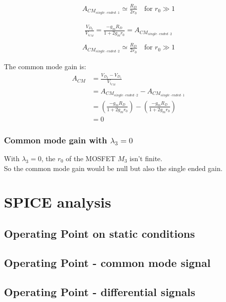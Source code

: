 \documentclass[10pt,a4paper]{book}
\begin{document}
\begin{align}
A_{CM_{single\cdot ended\cdot 1}} \simeq \frac{R_{D}}{2r_0} \quad \text{for } r_0 \gg 1
\end{align}

\begin{align}
\frac{V_{D_2}}{V_{i_{CM}}} = \frac{-g_m R_{D}}{1+2g_m r_0} = A_{CM_{single\cdot ended\cdot 2}}\\
\end{align}
\begin{align}
A_{CM_{single\cdot ended\cdot 2}} \simeq \frac{R_{D}}{2r_0} \quad \text{for } r_0 \gg 1
\end{align}

The common mode gain is:\\
\begin{align}
A_{CM} &= \frac{V_{D_2} - V_{D_1}}{V_{i_{CM}}}\\
&= A_{CM_{single\cdot ended\cdot 2}} -A_{CM_{single\cdot ended\cdot 1}} \\
&= \left(\frac{-g_m R_{D}}{1+2g_m r_0} \right) - \left(\frac{-g_m R_{D}}{1+2g_m r_0} \right)\\
&= 0
\end{align}

\subsubsection{Common mode gain with $\lambda_3 = 0$}
With $\lambda_3 = 0$, the $r_0$ of the MOSFET $M_3$ isn't finite.\\
So the common mode gain would be null but also the single ended gain.\par

\clearpage
\section{SPICE analysis}
\subsection{Operating Point on static conditions}



\subsection{Operating Point - common mode signal}



\subsection{Operating Point - differential signals}


\end{document}
